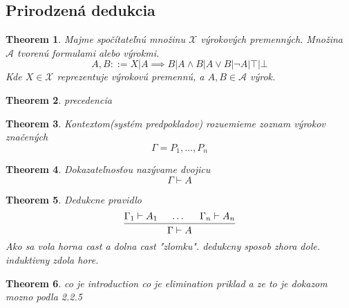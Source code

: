 \documentclass[a4paper,10pt,oneside]{report}%
\newtheorem{theorem}{Theorem}
\begin{document}
\subsection{Prirodzená dedukcia}

\begin{theorem}
    Majme spočítateľnú množinu $\mathcal{X}$ výrokových premenných. Množina
    $\mathcal{A}$ tvorenú formulami alebo výrokmi.
    \begin{equation}
        A, B ::= X | A \implies B | A \wedge B | A \vee B | \neg A | \top | \bot
    \end{equation}
    Kde $X \in \mathcal{X}$ reprezentuje výrokovú premennú, a $A, B \in \mathcal{A}$
    výrok.
\end{theorem}

\begin{theorem}
    precedencia
\end{theorem}

\begin{theorem}
    Kontextom(systém predpokladov) rozuemieme zoznam výrokov značených
    \begin{equation}
        \Gamma = P_{1}, \dots , P_{n}
    \end{equation}
\end{theorem}

\begin{theorem}
    Dokazateľnosťou nazývame dvojicu
    \begin{equation}
        \Gamma \vdash A
    \end{equation}
\end{theorem}

\begin{theorem}
    Dedukcne pravidlo
   \begin{equation}
        \begin{prooftree}
            \hypo{\Gamma_{1} \vdash A_{1}}
            \hypo{\dots}
            \hypo{\Gamma_{n} \vdash A_{n}}
            \infer3[]{\Gamma \vdash A}
        \end{prooftree}
    \end{equation}
    Ako sa vola horna cast a dolna cast "zlomku".
    dedukcny sposob zhora dole.
    induktivny zdola hore.
\end{theorem}

\begin{theorem}
    co je introduction co je elimination
    priklad a ze to je dokazom mozno podla 2.2.5

\end{theorem}
\end{document}
